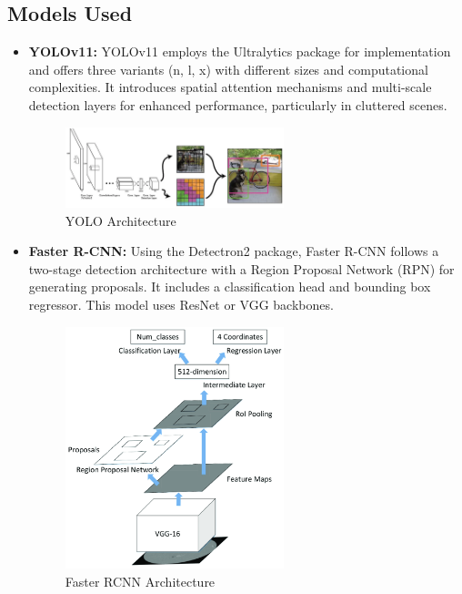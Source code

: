 \documentclass[a4paper]{article}
\begin{document}
\subsection{Models Used}
\begin{itemize}
    \item \textbf{YOLOv11\cite{2, 7}:} YOLOv11 employs the Ultralytics package for implementation and offers three variants (n, l, x) with different sizes and computational complexities. It introduces spatial attention mechanisms and multi-scale detection layers for enhanced performance, particularly in cluttered scenes.
    \begin{figure}[htbp]
        \centering
        \includegraphics[width=0.6\textwidth]{./images/yolo_arch.png}
        \caption{YOLO Architecture}
        \label{fig:Images}
    \end{figure}
    \item \textbf{Faster R-CNN\cite{4, 6}:} Using the Detectron2 package, Faster R-CNN follows a two-stage detection architecture with a Region Proposal Network (RPN) for generating proposals. It includes a classification head and bounding box regressor. This model uses ResNet or VGG backbones.
    \begin{figure}[htbp]
        \centering
        \includegraphics[width=0.6\textwidth]{./images/faster_rcnn_arch.png}
        \caption{Faster RCNN Architecture}
        \label{fig:Images}

\end{figure}
\end{itemize}
\end{document}
